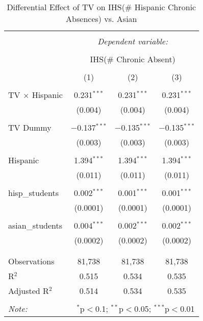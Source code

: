 
\begin{table}[!htbp] \centering 
  \caption{Differential Effect of TV on IHS(\# Hispanic Chronic Absences) vs. Asian} 
  \label{} 
\begin{tabular}{@{\extracolsep{-2pt}}lccc} 
\\[-1.8ex]\hline 
\hline \\[-1.8ex] 
 & \multicolumn{3}{c}{\textit{Dependent variable:}} \\ 
\cline{2-4} 
\\[-1.8ex] & \multicolumn{3}{c}{IHS(\# Chronic Absent)} \\ 
\\[-1.8ex] & (1) & (2) & (3)\\ 
\hline \\[-1.8ex] 
 TV $\times$ Hispanic & 0.231$^{***}$ & 0.231$^{***}$ & 0.231$^{***}$ \\ 
  & (0.004) & (0.004) & (0.004) \\ 
  & & & \\ 
 TV Dummy & $-$0.137$^{***}$ & $-$0.135$^{***}$ & $-$0.135$^{***}$ \\ 
  & (0.003) & (0.003) & (0.003) \\ 
  & & & \\ 
 Hispanic & 1.394$^{***}$ & 1.394$^{***}$ & 1.394$^{***}$ \\ 
  & (0.011) & (0.011) & (0.011) \\ 
  & & & \\ 
 hisp\_students & 0.002$^{***}$ & 0.001$^{***}$ & 0.001$^{***}$ \\ 
  & (0.0001) & (0.0001) & (0.0001) \\ 
  & & & \\ 
 asian\_students & 0.004$^{***}$ & 0.002$^{***}$ & 0.002$^{***}$ \\ 
  & (0.0002) & (0.0002) & (0.0002) \\ 
  & & & \\ 
\hline \\[-1.8ex] 
Observations & 81,738 & 81,738 & 81,738 \\ 
R$^{2}$ & 0.515 & 0.534 & 0.535 \\ 
Adjusted R$^{2}$ & 0.514 & 0.534 & 0.535 \\ 
\hline 
\hline \\[-1.8ex] 
\textit{Note:}  & \multicolumn{3}{r}{$^{*}$p$<$0.1; $^{**}$p$<$0.05; $^{***}$p$<$0.01} \\ 
\end{tabular} 
\end{table} 
